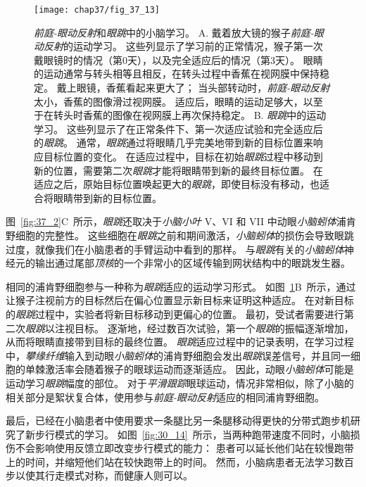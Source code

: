 \begin{figure}[htbp]
	\centering
	\texttt{[image: chap37/fig\_37\_13]}
	\caption{\textit{前庭-眼动反射}和\textit{眼跳}中的小脑学习。
		A. 戴着放大镜的猴子\textit{前庭-眼动反射}的运动学习。
		这些列显示了学习前的正常情况，猴子第一次戴眼镜时的情况（第0天），以及完全适应后的情况（第3天）。
		眼睛的运动通常与转头相等且相反，在转头过程中香蕉在视网膜中保持稳定。
		戴上眼镜，香蕉看起来更大了；
		当头部转动时，\textit{前庭-眼动反射}太小，香蕉的图像滑过视网膜。
		适应后，眼睛的运动足够大，以至于在转头时香蕉的图像在视网膜上再次保持稳定\cite{lisberger1988neural}。
		B. \textit{眼跳}中的运动学习。
		这些列显示了在正常条件下、第一次适应试验和完全适应后的\textit{眼跳}。
		通常，\textit{眼跳}通过将眼睛几乎完美地带到新的目标位置来响应目标位置的变化。
		在适应过程中，目标在初始\textit{眼跳}过程中移动到新的位置，需要第二次\textit{眼跳}才能将眼睛带到新的最终目标位置。
		在适应之后，原始目标位置唤起更大的\textit{眼跳}，即使目标没有移动，也适合将眼睛带到新的目标位置。}
	\label{fig:37_13}
\end{figure}


图~\ref{fig:37_2}C~所示，\textit{眼跳}还取决于\textit{小脑小叶} V、VI 和 VII 中动眼\textit{小脑蚓体}浦肯野细胞的完整性。
这些细胞在\textit{眼跳}之前和期间激活，\textit{小脑蚓体}的损伤会导致眼跳过度，就像我们在小脑患者的手臂运动中看到的那样。
与\textit{眼跳}有关的\textit{小脑蚓体}神经元的输出通过尾部\textit{顶核}的一个非常小的区域传输到网状结构中的眼跳发生器。


相同的浦肯野细胞参与一种称为\textit{眼跳}适应的运动学习形式。
如图~\ref{fig:37_13}B~所示，通过让猴子注视前方的目标然后在偏心位置显示新目标来证明这种适应。
在对新目标的\textit{眼跳}过程中，实验者将新目标移动到更偏心的位置。
最初，受试者需要进行第二次\textit{眼跳}以注视目标。
逐渐地，经过数百次试验，第一个\textit{眼跳}的振幅逐渐增加，从而将眼睛直接带到目标的最终位置。
\textit{眼跳}适应过程中的记录表明，在学习过程中，\textit{攀缘纤维}输入到动眼\textit{小脑蚓体}的浦肯野细胞会发出\textit{眼跳}误差信号，并且同一细胞的单棘激活率会随着猴子的眼球运动而逐渐适应。
因此，动眼\textit{小脑蚓体}可能是运动学习\textit{眼跳}幅度的部位。
对于\textit{平滑跟踪}眼球运动，情况非常相似，除了小脑的相关部分是絮状复合体，使用参与\textit{前庭-眼动反射}适应的相同浦肯野细胞。


最后，已经在小脑患者中使用要求一条腿比另一条腿移动得更快的分带式跑步机研究了新步行模式的学习。
如图~\ref{fig:30_14}~所示，当两种跑带速度不同时，小脑损伤不会影响使用反馈立即改变步行模式的能力：
患者可以延长他们站在较慢跑带上的时间，并缩短他们站在较快跑带上的时间。
然而，小脑病患者无法学习数百步以使其行走模式对称，而健康人则可以。



